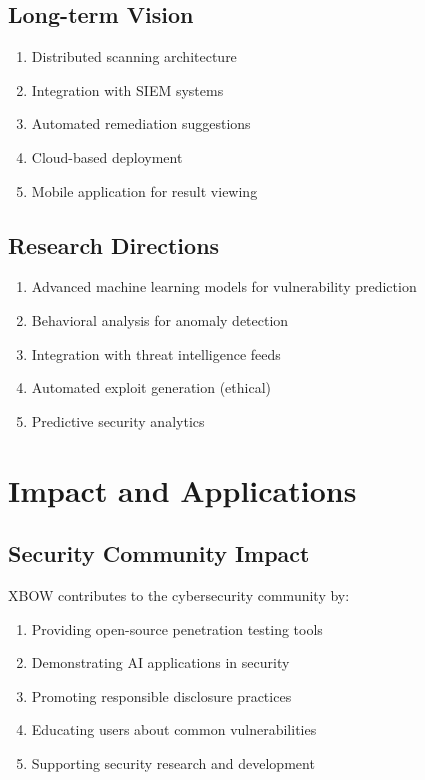 \documentclass[12pt,a4paper]{report}
\begin{document}
\subsection{Long-term Vision}

\begin{enumerate}
    \item Distributed scanning architecture
    \item Integration with SIEM systems
    \item Automated remediation suggestions
    \item Cloud-based deployment
    \item Mobile application for result viewing
\end{enumerate}

\subsection{Research Directions}

\begin{enumerate}
    \item Advanced machine learning models for vulnerability prediction
    \item Behavioral analysis for anomaly detection
    \item Integration with threat intelligence feeds
    \item Automated exploit generation (ethical)
    \item Predictive security analytics
\end{enumerate}

\section{Impact and Applications}

\subsection{Security Community Impact}

XBOW contributes to the cybersecurity community by:

\begin{enumerate}
    \item Providing open-source penetration testing tools
    \item Demonstrating AI applications in security
    \item Promoting responsible disclosure practices
    \item Educating users about common vulnerabilities
    \item Supporting security research and development
\end{enumerate}
\end{document}
